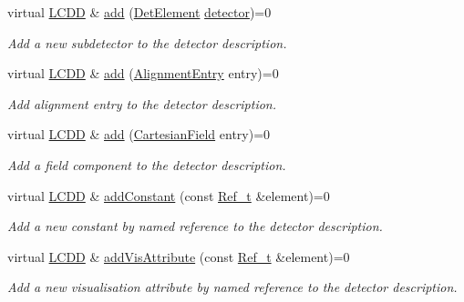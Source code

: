 \begin{DoxyCompactItemize}
virtual \hyperlink{class_d_d4hep_1_1_geometry_1_1_l_c_d_d}{L\+C\+DD} \& \hyperlink{class_d_d4hep_1_1_geometry_1_1_l_c_d_d_a9b756dac3f0ebc5393072f23c96cb490}{add} (\hyperlink{class_d_d4hep_1_1_geometry_1_1_det_element}{Det\+Element} \hyperlink{class_d_d4hep_1_1_geometry_1_1_l_c_d_d_a0ed0c4e5d72a1e07ce11cf2592d6de3e}{detector})=0
\begin{DoxyCompactList}\small\item\em Add a new subdetector to the detector description. \end{DoxyCompactList}\item 
virtual \hyperlink{class_d_d4hep_1_1_geometry_1_1_l_c_d_d}{L\+C\+DD} \& \hyperlink{class_d_d4hep_1_1_geometry_1_1_l_c_d_d_a338b46c3a01bcd48b9c9f8ad74501c1d}{add} (\hyperlink{class_d_d4hep_1_1_geometry_1_1_alignment_entry}{Alignment\+Entry} entry)=0
\begin{DoxyCompactList}\small\item\em Add alignment entry to the detector description. \end{DoxyCompactList}\item 
virtual \hyperlink{class_d_d4hep_1_1_geometry_1_1_l_c_d_d}{L\+C\+DD} \& \hyperlink{class_d_d4hep_1_1_geometry_1_1_l_c_d_d_a57833b868c0abeb0d1ee43d1895a5996}{add} (\hyperlink{class_d_d4hep_1_1_geometry_1_1_cartesian_field}{Cartesian\+Field} entry)=0
\begin{DoxyCompactList}\small\item\em Add a field component to the detector description. \end{DoxyCompactList}\item 
virtual \hyperlink{class_d_d4hep_1_1_geometry_1_1_l_c_d_d}{L\+C\+DD} \& \hyperlink{class_d_d4hep_1_1_geometry_1_1_l_c_d_d_ac2bc82eba942bd452da56bbf958d8aad}{add\+Constant} (const \hyperlink{group___d_d4_h_e_p___g_e_o_m_e_t_r_y_ga40af83be6718bb8828a3d83dc7f8c930}{Ref\+\_\+t} \&element)=0
\begin{DoxyCompactList}\small\item\em Add a new constant by named reference to the detector description. \end{DoxyCompactList}\item 
virtual \hyperlink{class_d_d4hep_1_1_geometry_1_1_l_c_d_d}{L\+C\+DD} \& \hyperlink{class_d_d4hep_1_1_geometry_1_1_l_c_d_d_a705cc171273fe3aa63100385b1bd7191}{add\+Vis\+Attribute} (const \hyperlink{group___d_d4_h_e_p___g_e_o_m_e_t_r_y_ga40af83be6718bb8828a3d83dc7f8c930}{Ref\+\_\+t} \&element)=0
\begin{DoxyCompactList}\small\item\em Add a new visualisation attribute by named reference to the detector description. \end{DoxyCompactList}\item 

\end{DoxyCompactItemize}
